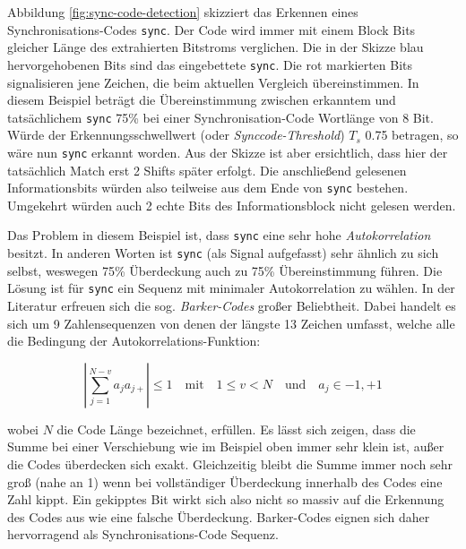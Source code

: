 Abbildung \ref{fig:sync-code-detection} skizziert das Erkennen eines Synchronisations-Codes \texttt{sync}. Der Code wird immer mit einem Block Bits gleicher \mbox{Länge} des extrahierten Bitstroms verglichen. Die in der Skizze blau hervorgehobenen Bits sind das ein\-gebettete \texttt{sync}. Die rot markierten Bits signal\-isieren jene Zeichen, die beim \mbox{aktuellen} Vergleich über\-einstimmen. In diesem Beispiel beträgt die Über\-einstimmung zwischen er\-kanntem und tatsächlichem \texttt{sync} 75\% bei einer Synchronisation-Code Wortlänge von 8 Bit. Würde der Erkennungsschwellwert (oder \textit{Synccode-Threshold}) ${T}_{s}$ 0.75 betragen, so wäre nun \texttt{sync} erkannt worden. Aus der Skizze ist aber ersichtlich, dass hier der tatsächlich Match erst 2 Shifts später erfolgt. Die anschließend gelesenen Informationsbits würden also teilweise aus dem Ende von \texttt{sync} bestehen. Umgekehrt würden auch 2 echte Bits des Informationsblock nicht gelesen werden.

Das Problem in diesem Beispiel ist, dass \texttt{sync} eine sehr hohe \textit{Autokorrelation} besitzt. In anderen Worten ist \texttt{sync} (als Signal aufgefasst) sehr ähnlich zu sich selbst, weswegen 75\% Überdeckung auch zu 75\% Übereinstimmung führen. Die Lösung ist für \texttt{sync} ein Sequenz mit minimaler Autokorrelation zu wählen. In der Literatur\cite{chang2012location}\cite{lie2006robust}\cite{huang2002blind} erfreuen sich die sog. \textit{Barker-Codes}\cite{barker1953group} großer Beliebtheit. Dabei handelt es sich um 9 Zahlensequenzen von denen der längste 13 Zeichen umfasst, welche alle die Bedingung der Autokorrelations-Funktion:

	 \begin{equation}
		 | \sum\limits_{j=1}^{N-v} a_j {a}_{j+} | \leq 1 \quad\mbox{mit}\quad 1 \leq v < N \quad\mbox{und}\quad a_j \in {-1,+1}
	 	\label{equ:barker-correlation}
	 \end{equation}

wobei $N$ die Code Länge bezeichnet, erfüllen. Es lässt sich zeigen, dass die Summe bei einer Verschiebung wie im Beispiel oben immer sehr klein ist, außer die Codes überdecken sich exakt. Gleichzeitig bleibt die Summe immer noch sehr groß (nahe an 1) wenn bei vollständiger Überdeckung innerhalb des Codes eine Zahl kippt. Ein gekipptes Bit wirkt sich also nicht so massiv auf die Erkennung des Codes aus wie eine falsche Überdeckung. Barker-Codes eignen sich daher hervorragend als Synchronisations-Code Sequenz. 

